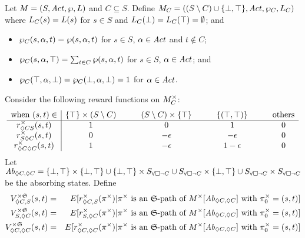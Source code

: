 Let $M = (S, \mathit{Act}, \wp, L)$ and $C \subseteq S$. Define ${M}_{C} =
((S \setminus C) \cup \{ \bot, \top \}, \mathit{Act}, {\wp}_{C}, {L}_{C})$ where
${L}_{C} (s) = L (s)$ for $s \in S$ and ${L}_{C} (\bot) =
{L}_{C} (\top) = \emptyset$; and
\begin{itemize}
\item ${\wp}_{C} (s, \alpha, t) = \wp (s, \alpha, t)$ for $s \in
  S$, $\alpha \in \mathit{Act}$ and $t \not\in C$;
\item ${\wp}_{C} (s, \alpha, \top) = \sum_{t \in C} \wp (s,
  \alpha, t)$ for $s \in S$, $\alpha \in \mathit{Act}$; and
\item ${\wp}_{C} (\top, \alpha, \bot) = {\wp}_{C} (\bot,
  \alpha, \bot) = 1$ for $\alpha \in \mathit{Act}$.
\end{itemize}

Consider the following reward functions on ${M}_{C}^{\times}$:
\[
\begin{array}{c|cccccccc}
  \textmd{when } (s, t) \in
  & \{ \top \} \times (S \setminus C)
  & \hspace{1em}
  & (S \setminus C) \times \{ \top \}
  & \hspace{1em}
  & \{ (\top, \top) \}
  & \hspace{1em}
  & \textmd{others}\\
  \hline
  {r}_{{\lozenge C}S}^{\times} (s, t) & 1 && 0 && 1 && 0\\
  {r}_{S{\lozenge C}}^{\times} (s, t) & 0 && -\epsilon && -\epsilon && 0\\
  {r}_{{\lozenge C}{\lozenge C}}^{\times} (s, t) & 1 && -\epsilon && 1-\epsilon && 0\\
\end{array}
\]
Let $\mathit{Ab}_{\lozenge C, \lozenge C} = \{ \bot, \top \} \times \{ \bot,
\top \} \cup \{ \bot, \top \} \times S_{\forall\square \neg C} \cup S_{\forall\square \neg C} \times \{
\bot, \top \} \cup S_{\forall\square \neg C} \times S_{\forall\square \neg C}$ be the absorbing states.
Define
\begin{eqnarray*}
  {V}_{\lozenge C, S}^{\times \mathfrak{S}} (s, t) & = &
  E[ {r}_{\lozenge C, S}^{\times} (\pi^{\times}) | \pi^{\times} \textmd{ is an
  $\mathfrak{S}$-path of } M^{\times}[\mathit{Ab}_{\lozenge C, \lozenge C}]
  \textmd{ with } \pi_0^{\times} = (s, t) ]\\
  {V}_{S, \lozenge C}^{\times \mathfrak{S}} (s, t) & = &
  E[ {r}_{S, \lozenge C}^{\times} (\pi^{\times}) | \pi^{\times} \textmd{ is an
  $\mathfrak{S}$-path of } M^{\times}[\mathit{Ab}_{\lozenge C, \lozenge C}]
  \textmd{ with } \pi_0^{\times} = (s, t) ]\\
  {V}_{\lozenge C, \lozenge C}^{\times \mathfrak{S}} (s, t) & = &
  E[ {r}_{\lozenge C, \lozenge C}^{\times} (\pi^{\times}) | \pi^{\times} \textmd{ is an
  $\mathfrak{S}$-path of } M^{\times}[\mathit{Ab}_{\lozenge C, \lozenge C}]
  \textmd{ with } \pi_0^{\times} = (s, t) ]
\end{eqnarray*}

